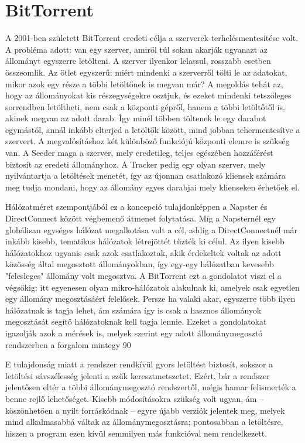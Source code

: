 \documentclass[a4paper]{article}
\begin{document}
\section{BitTorrent}
A 2001-ben született BitTorrent eredeti célja a szerverek terhelésmentesítése volt. A probléma adott: van egy szerver,
amiről túl sokan akarják ugyanazt az állományt egyszerre letölteni. A szerver ilyenkor lelassul, rosszabb esetben
összeomlik. Az ötlet egyszerű: miért mindenki a szerverről tölti le az adatokat, mikor azok egy része a többi
letöltőnek is megvan már? A megoldás tehát az, hogy az állományokat kis részegységekre osztjuk, és ezeket mindenki
tetszőleges sorrendben letöltheti, nem csak a központi gépről, hanem a többi letöltőtől is, akinek megvan az adott
darab. Így minél többen töltenek le egy darabot egymástól, annál inkább elterjed a letöltők között, mind jobban
tehermentesítve a szervert. A megvalósításhoz két különböző funkciójú központi elemre is szükség van. A Seeder maga a
szerver, mely eredetileg, teljes egészében hozzáférést biztosít az eredeti állományhoz. A Tracker pedig egy olyan
szerver, mely nyilvántartja a letöltések menetét, így az újonnan csatlakozó kliensek számára meg tudja mondani, hogy az
állomány egyes darabjai mely klienseken érhetőek el.

Hálózatméret szempontjából ez a koncepció tulajdonképpen a Napster és DirectConnect között végbemenő átmenet
folytatása. Míg a Napsternél egy globálisan egységes hálózat megalkotása volt a cél, addig a DirectConnectnél már
inkább kisebb, tematikus hálózatok létrejöttét tűzték ki célul. Az ilyen kisebb hálózatokhoz ugyanis csak azok
csatlakoztak, akik érdekeltek voltak az adott közösség által megosztott állományokban, így egy-egy hálózatban kevesebb
"felesleges" állomány volt megosztva. A BitTorrent ezt a gondolatot viszi el a végsőkig: itt egyenesen olyan
mikro-hálózatok alakulnak ki, amelyek csak egyetlen egy állomány megosztásáért felelősek. Persze ha valaki akar,
egyszerre több ilyen hálózatnak is tagja lehet, ám számára így is csak a hasznos állományok megosztását segítő
hálózatoknak kell tagja lennie. Ezeket a gondolatokat igazolják azok a mérések is, melyek szerint egy adott
állománymegosztó rendszerben a forgalom mintegy 90%

E tulajdonság miatt a rendszer rendkívül gyors letöltést biztosít, sokszor a letöltési sávszélesség jelenti a szűk
keresztmetszetet. Ezért, bár a rendszer jelentősen eltér a többi állománymegosztó rendszertől, mégis hamar felismerték
a benne rejlő lehetőséget. Kisebb módosításokra szükség volt ugyan, ám – köszönhetően a nyílt forráskódnak – egyre
újabb verziók jelentek meg, melyek mind alkalmasabbá váltak az állománymegosztásra; pontosabban a letöltésre, hiszen a
program ezen kívül semmilyen más funkcióval nem rendelkezett.
\end{document}
